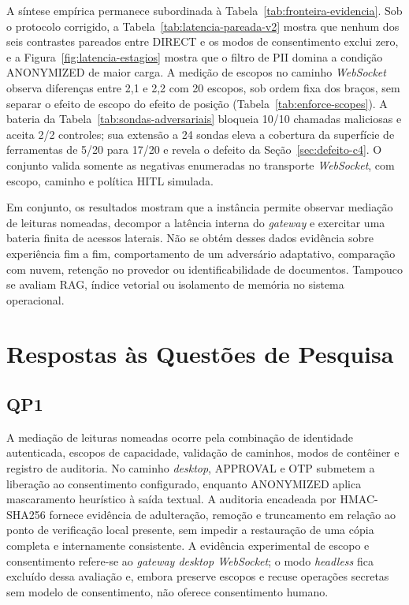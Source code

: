 A síntese empírica permanece subordinada à Tabela~\ref{tab:fronteira-evidencia}. Sob o protocolo corrigido, a Tabela~\ref{tab:latencia-pareada-v2} mostra que nenhum dos seis contrastes pareados entre DIRECT e os modos de consentimento exclui zero, e a Figura~\ref{fig:latencia-estagios} mostra que o filtro de PII domina a condição ANONYMIZED de maior carga. A medição de escopos no caminho \textit{WebSocket} observa diferenças entre 2,1 e 2,2\micro{} com 20 escopos, sob ordem fixa dos braços, sem separar o efeito de escopo do efeito de posição (Tabela~\ref{tab:enforce-scopes}). A bateria da Tabela~\ref{tab:sondas-adversariais} bloqueia 10/10 chamadas maliciosas e aceita 2/2 controles; sua extensão a 24 sondas eleva a cobertura da superfície de ferramentas de 5/20 para 17/20 e revela o defeito da Seção~\ref{sec:defeito-c4}. O conjunto valida somente as negativas enumeradas no transporte \textit{WebSocket}, com escopo, caminho e política HITL simulada.

Em conjunto, os resultados mostram que a instância permite observar mediação de leituras nomeadas, decompor a latência interna do \textit{gateway} e exercitar uma bateria finita de acessos laterais. Não se obtém desses dados evidência sobre experiência fim a fim, comportamento de um adversário adaptativo, comparação com nuvem, retenção no provedor ou identificabilidade de documentos. Tampouco se avaliam RAG, índice vetorial ou isolamento de memória no sistema operacional.

\section{Respostas às Questões de Pesquisa}
\subsection{QP1}
A mediação de leituras nomeadas ocorre pela combinação de identidade autenticada, escopos de capacidade, validação de caminhos, modos de contêiner e registro de auditoria. No caminho \textit{desktop}, APPROVAL e OTP submetem a liberação ao consentimento configurado, enquanto ANONYMIZED aplica mascaramento heurístico à saída textual. A auditoria encadeada por HMAC-SHA256 fornece evidência de adulteração, remoção e truncamento em relação ao ponto de verificação local presente, sem impedir a restauração de uma cópia completa e internamente consistente. A evidência experimental de escopo e consentimento refere-se ao \textit{gateway desktop WebSocket}; o modo \textit{headless} fica excluído dessa avaliação e, embora preserve escopos e recuse operações secretas sem modelo de consentimento, não oferece consentimento humano.

